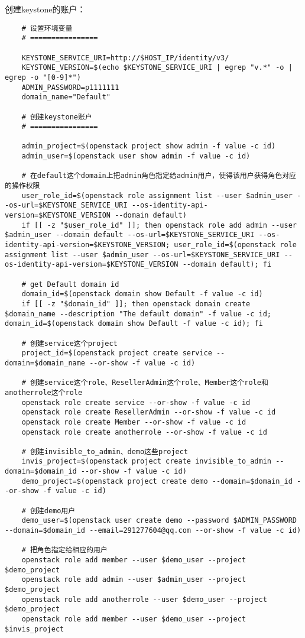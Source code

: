 \documentclass[a4paper,left=1.5cm,right=1.5cm,11pt]{article}
\begin{document}
	创建keystone的账户：
	\begin{lstlisting}
	# 设置环境变量
	# ================

	KEYSTONE_SERVICE_URI=http://$HOST_IP/identity/v3/
	KEYSTONE_VERSION=$(echo $KEYSTONE_SERVICE_URI | egrep "v.*" -o | egrep -o "[0-9]*")
	ADMIN_PASSWORD=p1111111
	domain_name="Default"

	# 创建keystone账户
	# ================

	admin_project=$(openstack project show admin -f value -c id)
	admin_user=$(openstack user show admin -f value -c id)

	# 在default这个domain上把admin角色指定给admin用户，使得该用户获得角色对应的操作权限
	user_role_id=$(openstack role assignment list --user $admin_user --os-url=$KEYSTONE_SERVICE_URI --os-identity-api-version=$KEYSTONE_VERSION --domain default)
	if [[ -z "$user_role_id" ]]; then openstack role add admin --user $admin_user --domain default --os-url=$KEYSTONE_SERVICE_URI --os-identity-api-version=$KEYSTONE_VERSION; user_role_id=$(openstack role assignment list --user $admin_user --os-url=$KEYSTONE_SERVICE_URI --os-identity-api-version=$KEYSTONE_VERSION --domain default); fi
	
	# get Default domain id
	domain_id=$(openstack domain show Default -f value -c id)
	if [[ -z "$domain_id" ]]; then openstack domain create $domain_name --description "The default domain" -f value -c id; domain_id=$(openstack domain show Default -f value -c id); fi

	# 创建service这个project
	project_id=$(openstack project create service --domain=$domain_name --or-show -f value -c id)

	# 创建service这个role、ResellerAdmin这个role、Member这个role和anotherrole这个role
	openstack role create service --or-show -f value -c id
	openstack role create ResellerAdmin --or-show -f value -c id
	openstack role create Member --or-show -f value -c id
	openstack role create anotherrole --or-show -f value -c id
	
	# 创建invisible_to_admin、demo这些project
	invis_project=$(openstack project create invisible_to_admin --domain=$domain_id --or-show -f value -c id)
	demo_project=$(openstack project create demo --domain=$domain_id --or-show -f value -c id)

	# 创建demo用户
	demo_user=$(openstack user create demo --password $ADMIN_PASSWORD --domain=$domain_id --email=291277604@qq.com --or-show -f value -c id)

	# 把角色指定给相应的用户
	openstack role add member --user $demo_user --project $demo_project
	openstack role add admin --user $admin_user --project $demo_project
	openstack role add anotherrole --user $demo_user --project $demo_project
	openstack role add member --user $demo_user --project $invis_project
	

\end{lstlisting}
\end{document}
